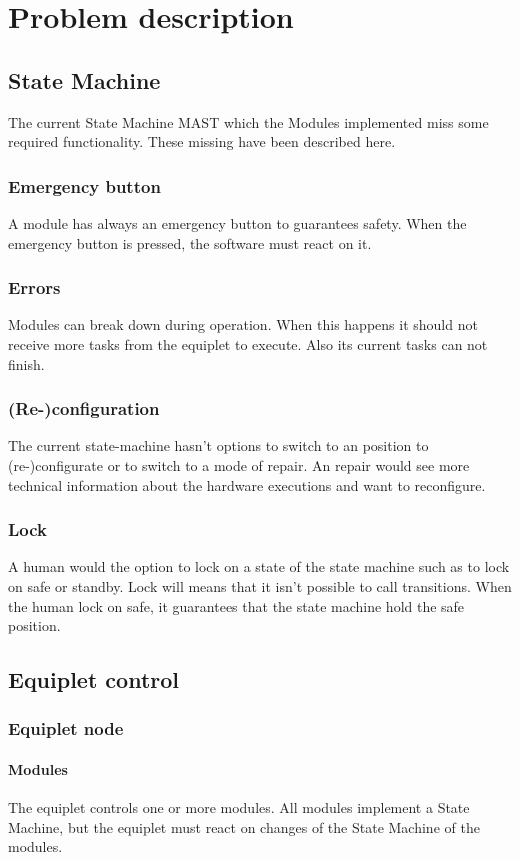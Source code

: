 \documentclass[12pt,a4paper]{report}
\begin{document}
\section{Problem description}
\subsection{State Machine}
The current State Machine MAST which the Modules implemented miss some required functionality. These missing have been described here.
\subsubsection{Emergency button}
A module has always an emergency button to guarantees safety. When the emergency button is pressed, the software must react on it.
\subsubsection{Errors}
Modules can break down during operation. When this happens it should not receive more tasks from the equiplet to execute. Also its current tasks can not finish.
\subsubsection{(Re-)configuration}
The current state-machine hasn't options to switch to an position to (re-)configurate or to switch to a mode of repair. An repair would see more technical information about the hardware executions and want to reconfigure.
\subsubsection{Lock}
A human would the option to lock on a state of the state machine such as to lock on safe or standby. Lock will means that it isn't possible to call transitions. When the human lock on safe, it guarantees that the state machine hold the safe position.
\subsection{Equiplet control}
\subsubsection{Equiplet node}
\paragraph{Modules}The equiplet controls one or more modules. All modules implement a State Machine, but the equiplet must react on changes of the State Machine of the modules.
\end{document}
